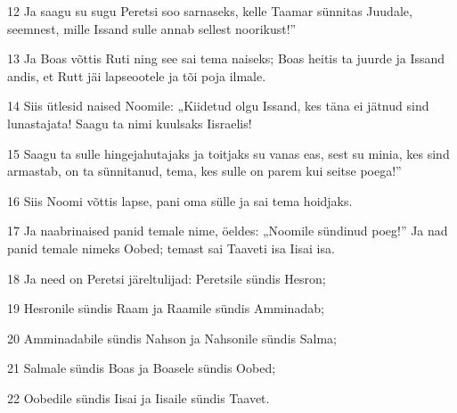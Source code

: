 \par 12 Ja saagu su sugu Peretsi soo sarnaseks, kelle Taamar sünnitas Juudale, seemnest, mille Issand sulle annab sellest noorikust!”
\par 13 Ja Boas võttis Ruti ning see sai tema naiseks; Boas heitis ta juurde ja Issand andis, et Rutt jäi lapseootele ja tõi poja ilmale.
\par 14 Siis ütlesid naised Noomile: „Kiidetud olgu Issand, kes täna ei jätnud sind lunastajata! Saagu ta nimi kuulsaks Iisraelis!
\par 15 Saagu ta sulle hingejahutajaks ja toitjaks su vanas eas, sest su minia, kes sind armastab, on ta sünnitanud, tema, kes sulle on parem kui seitse poega!”
\par 16 Siis Noomi võttis lapse, pani oma sülle ja sai tema hoidjaks.
\par 17 Ja naabrinaised panid temale nime, öeldes: „Noomile sündinud poeg!” Ja nad panid temale nimeks Oobed; temast sai Taaveti isa Iisai isa.
\par 18 Ja need on Peretsi järeltulijad: Peretsile sündis Hesron;
\par 19 Hesronile sündis Raam ja Raamile sündis Amminadab;
\par 20 Amminadabile sündis Nahson ja Nahsonile sündis Salma;
\par 21 Salmale sündis Boas ja Boasele sündis Oobed;
\par 22 Oobedile sündis Iisai ja Iisaile sündis Taavet.




